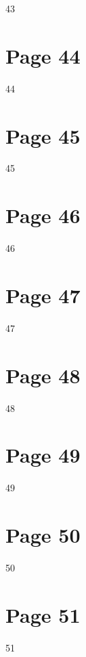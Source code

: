 \documentclass{article}
\begin{document}
 
 43  
 


\section*{Page 44}
   
 
 44  
 


\section*{Page 45}
   
 
 45  
 


\section*{Page 46}
   
 
 46  
 


\section*{Page 47}
   
 
 47  
 


\section*{Page 48}
   
 
 48  
 


\section*{Page 49}
   
 
 49  
 


\section*{Page 50}
   
 
 50  
 


\section*{Page 51}
   
 
 51  
 
\end{document}
